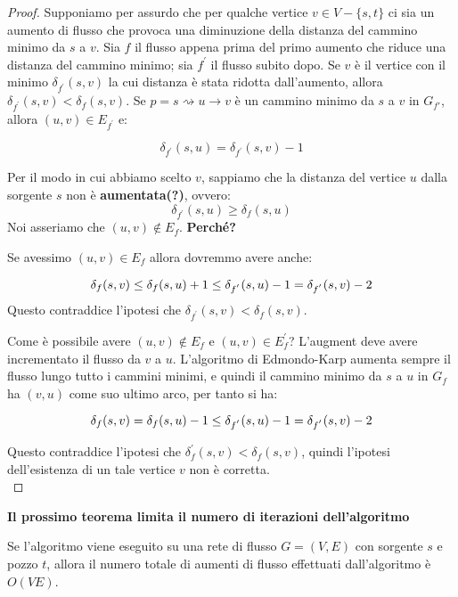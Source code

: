 \begin{proof}
  Supponiamo per assurdo che per qualche vertice $v \in V
    - \{s, t\}$ ci sia un aumento di flusso che provoca una diminuzione della
  distanza del cammino minimo da $s$ a $v$. Sia $f$ il flusso appena prima del
  primo aumento che riduce una distanza del cammino minimo; sia $f^{'}$ il flusso
  subito dopo. Se $v$ è il vertice con il minimo $\delta_{f^{'}}(s,v)$ la cui
  distanza è stata ridotta dall'aumento, allora $\delta_{f^{'}}(s,v) <
    \delta_{f}(s,v)$. Se $p = s \rightsquigarrow u \rightarrow v$ è un cammino
  minimo da $s$ a $v$ in $G_{f{'}}$, allora $(u,v) \in E_{f^{'}}$ e:

  $$
    \delta_{f^{'}}(s,u) = \delta_{f^{'}}(s,v) -1
  $$

  Per il modo in cui abbiamo scelto $v$, sappiamo che la distanza del vertice
  $u$ dalla sorgente $s$ non è \textbf{aumentata(?)}, ovvero:
  $$
    \delta_{f^{'}}(s,u) \ge \delta_{f}(s,u)
  $$
  Noi asseriamo che $(u,v) \notin E_f$. \textbf{Perché?}

  Se avessimo $(u,v) \in E_f$ allora dovremmo avere anche:

  $$
    \delta_{f}(s,v) \le \delta_{f}(s,u) +1 \\
    \le \delta_{f^{'}}(s,u) -1 \\
    = \delta_{f^{'}}(s,v) -2
  $$
  Questo contraddice l'ipotesi che $\delta_{f^{'}}(s,v) < \delta_{f}(s,v)$.

  Come è possibile avere $(u,v) \notin E_f$ e $(u,v) \in E_f^{'}$? L'augment
  deve avere incrementato il flusso da $v$ a $u$. L'algoritmo di Edmondo-Karp
  aumenta sempre il flusso lungo tutto i cammini minimi, e quindi il cammino
  minimo da $s$ a $u$ in $G_f$ ha $(v,u)$ come suo ultimo arco, per tanto si
  ha:

  $$
    \delta_{f}(s,v) = \delta_{f}(s,u) -1 \\
    \le \delta_{f^{'}}(s,u) -1 \\
    = \delta_{f^{'}}(s,v) -2
  $$

  Questo contraddice l'ipotesi che $\delta_f^{'}(s,v) < \delta_f(s,v)$, quindi
  l'ipotesi dell'esistenza di un tale vertice $v$ non è corretta.\\
\end{proof}

\textbf{Il prossimo teorema limita il numero di iterazioni dell'algoritmo}\\

\begin{minipage}{\textwidth}
  \begin{myblockquote}
    \begin{theorem}
      Se l'algoritmo viene eseguito su una rete di flusso $G = (V, E)$ con
      sorgente $s$ e pozzo $t$, allora il numero totale di aumenti di flusso
      effettuati dall'algoritmo è $O(VE)$.
    \end{theorem}
  \end{myblockquote}
\end{minipage}

